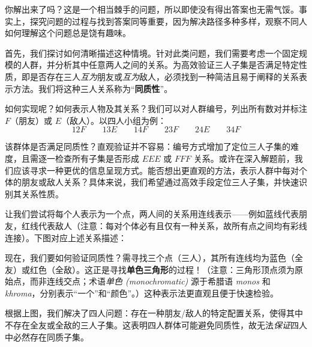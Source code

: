 你解出来了吗？这是一个相当棘手的问题，所以即使没有得出答案也无需气馁。事实上，探究问题的过程与找到答案同等重要，因为解决路径多种多样，观察不同人如何理解这个问题总是饶有趣味。

首先，我们探讨如何清晰描述这种情境。针对此类问题，我们需要考虑一个固定规模的人群，并分析其中任意两人之间的关系。为高效验证三人子集是否满足特定性质，即是否存在三人\emph{互为}朋友或\emph{互为}敌人，必须找到一种简洁且易于阐释的关系表示方法。我们将这种三人关系称为``\textbf{同质性}''。

如何实现呢？如何表示人物及其关系？我们可以对人群编号，列出所有数对并标注 $F$（朋友）或 $E$（敌人）。以四人小组为例：
\[12F \qquad 13E \qquad 14F \qquad 23F \qquad 24E \qquad 34F\]

该群体是否满足同质性？直观验证并不容易：编号方式增加了定位三人子集的难度，且需逐一检查所有子集是否形成 $E E E$ 或 $F F F$ 关系。或许在深入解题前，我们应该寻求一种更优的信息呈现方式。能否想出更直观的方法，表示人群中每对个体的朋友或敌人关系？具体来说，我们希望通过高效手段定位三人子集，并快速识别其关系性质。

让我们尝试将每个人表示为一个点，两人间的关系用连线表示——例如蓝线代表朋友，红线代表敌人（注意：每对个体必有且仅有一种关系，故所有点之间均有彩线连接）。下图对应上述关系描述：

\begin{center}
\end{center}

现在，我们要如何验证同质性？需寻找三个点（三人），其所有连线均为蓝色（全友）或红色（全敌）。这正是寻找\textbf{单色三角形}的过程！（注意：三角形顶点须为原始点，而非连线交点；术语\emph{单色 (monochromatic)} 源于希腊语 \emph{monos} 和 \emph{khroma}，分别表示``一个''和``颜色''。）这种表示法更直观且便于快速检验。

根据上图，我们解决了四人问题：存在一种朋友/敌人的特定配置关系，使得其中不存在全友或全敌的三人子集。这表明四人群体可能避免同质性，故无法\emph{保证}四人中必然存在同质子集。

